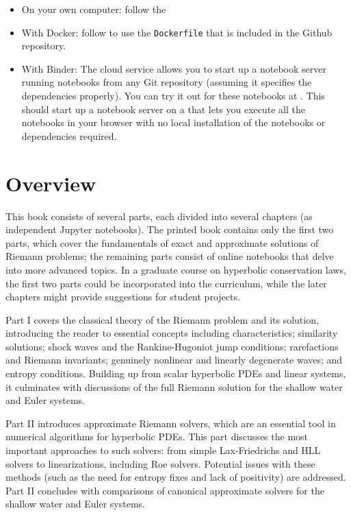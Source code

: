 \documentclass{SIAMbook2016}
\providecommand{\tightlist}{%
      \setlength{\itemsep}{0pt}\setlength{\parskip}{0pt}}
\begin{document}
\begin{itemize}
\tightlist
\item
  On your own computer: follow the
\item
  With Docker: follow
   to use the \texttt{Dockerfile} that is included in the
  Github repository.
\item
  With Binder: The cloud service 
  allows you to start up a notebook server running notebooks from any
  Git repository (assuming it specifies the dependencies properly). You
  can try it out for these notebooks at
  . This should start up a notebook server on a
   that
  lets you execute all the notebooks in your browser with no local
  installation of the notebooks or dependencies required.
\end{itemize}

\hypertarget{overview}{%
\section{Overview}\label{overview}}

This book consists of several parts, each divided into several chapters
(as independent Jupyter notebooks). The printed book contains only the
first two parts, which cover the fundamentals of exact and approximate
solutions of Riemann problems; the remaining parts consist of online
notebooks that delve into more advanced topics. In a graduate course on
hyperbolic conservation laws, the first two parts could be incorporated
into the curriculum, while the later chapters might provide suggestions
for student projects.

Part I covers the classical theory of the Riemann problem and its
solution, introducing the reader to essential concepts including
characteristics; similarity solutions; shock waves and the
Rankine-Hugoniot jump conditions; rarefactions and Riemann invariants;
genuinely nonlinear and linearly degenerate waves; and entropy
conditions. Building up from scalar hyperbolic PDEs and linear systems,
it culminates with discussions of the full Riemann solution for the
shallow water and Euler systems.

Part II introduces approximate Riemann solvers, which are an essential
tool in numerical algorithms for hyperbolic PDEs. This part discusses
the most important approaches to such solvers: from simple
Lax-Friedrichs and HLL solvers to linearizations, including Roe solvers.
Potential issues with these methods (such as the need for entropy fixes
and lack of positivity) are addressed. Part II concludes with
comparisons of canonical approximate solvers for the shallow water and
Euler systems.
\end{document}
